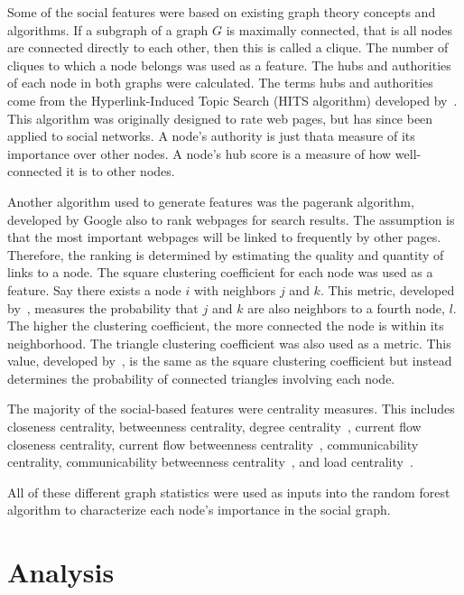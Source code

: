 \documentclass[10pt,twocolumn,conference]{IEEEtran}
\begin{document}
Some of the social features were based on existing graph theory concepts and algorithms.
If a subgraph of a graph $G$ is maximally connected, that is all nodes are connected directly to each other, then this is called a clique.
The number of cliques to which a node belongs was used as a feature.
The hubs and authorities of each node in both graphs were calculated.
The terms hubs and authorities come from the Hyperlink-Induced Topic Search (HITS algorithm) developed by~\cite{kleinberg_hubs_1999}.
This algorithm was originally designed to rate web pages, but has since been applied to social networks.
A node's authority is just that\textemdash{}a measure of its importance over other nodes.
A node's hub score is a measure of how well-connected it is to other nodes.

Another algorithm used to generate features was the pagerank algorithm, developed by Google 
\cite{page_pagerank_1999} also to rank webpages for search results.
The assumption is that the most important webpages will be linked to frequently by other pages.
Therefore, the ranking is determined by estimating the quality and quantity of links to a node.
The square clustering coefficient for each node was used as a feature.
Say there exists a node $i$ with neighbors $j$ and $k$.
This metric, developed by~\cite{lind_cycles_2005}, measures the probability that $j$ and $k$ are also neighbors to a fourth node, $l$.
The higher the clustering coefficient, the more connected the node is within its neighborhood.
The triangle clustering coefficient was also used as a metric.
This value, developed by~\cite{saramaki_generalizations_2007}, is the same as the square clustering coefficient but instead determines the probability of connected triangles involving each node.

The majority of the social-based features were centrality measures.
This includes closeness centrality, betweenness centrality, degree centrality~\cite{borgatti2011analyzing}, current flow closeness centrality, current flow betweenness centrality~\cite{brandes2005centrality}, communicability centrality, communicability betweenness centrality~\cite{estrada2008communicability}, and load centrality~\cite{newman2001scientific}.

All of these different graph statistics were used as inputs into the random forest algorithm to characterize each node's importance in the social graph.


\section{Analysis} \label{Analysis}
\end{document}
